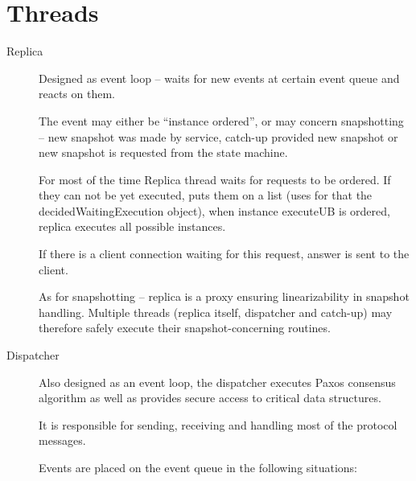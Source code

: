 \section{Threads}
\label{sec:threads}

\begin{description}
  \item[Replica] \hfill
    
    Designed as event loop -- waits for new events at certain event queue and reacts on them.

    The event may either be ``instance ordered'', or may concern snapshotting -- new snapshot was made by service, catch-up provided new snapshot or new snapshot is requested from the state machine.

    For most of the time Replica thread waits for requests to be ordered. If they can not be yet executed, puts them on a list (uses for that the decidedWaitingExecution object), when instance executeUB is ordered, replica executes all possible instances.
    
    If there is a client connection waiting for this request, answer is sent to the client.
    
    As for snapshotting -- replica is a proxy ensuring linearizability in snapshot handling.
    Multiple threads (replica itself, dispatcher and catch-up) may therefore safely execute their snapshot-concerning routines.
    

  \item[Dispatcher] \hfill
    
    Also designed as an event loop, the dispatcher executes Paxos consensus algorithm as well as provides secure access to critical data structures.

    It is responsible for sending, receiving and handling most of the protocol messages. 
    
    Events are placed on the event queue in the following situations:
    

\end{description}
